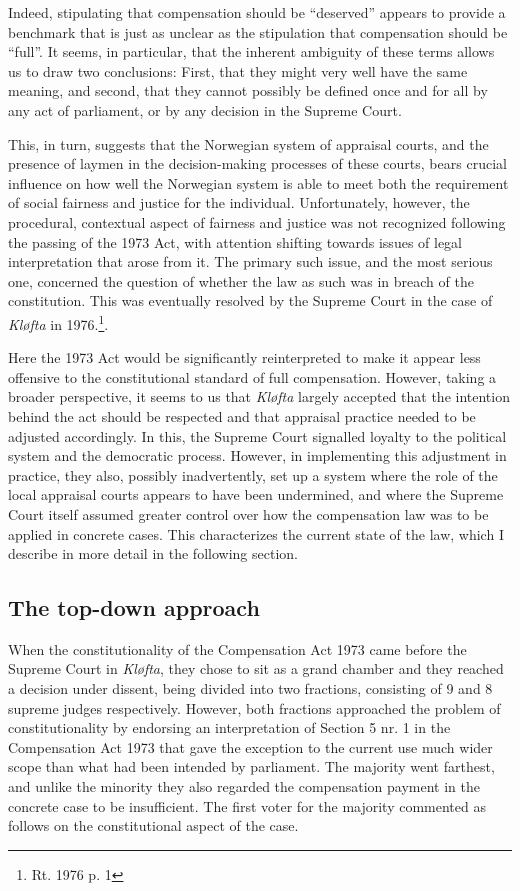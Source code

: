 Indeed, stipulating that compensation should be ``deserved'' appears to provide a benchmark that is just as unclear as the stipulation that compensation should be ``full''. It seems, in particular, that the inherent ambiguity of these terms allows us to draw two conclusions: First, that they might very well have the same meaning, and second, that they cannot possibly be defined once 
and for all by any act of parliament, or by any decision in the Supreme Court.

This, in turn, suggests that the Norwegian system of appraisal courts, and the presence of laymen in the decision-making processes of these courts, bears crucial influence on how well the Norwegian system is able to meet both the requirement of social fairness and justice for the individual. Unfortunately, however, the procedural, contextual aspect of fairness and justice was not recognized following the passing of the 1973 Act, with attention shifting towards issues of legal interpretation that arose from it. The primary such issue, and the most serious one, concerned the question of whether the law as such was in breach of the constitution. This was eventually resolved by the Supreme Court in the case of \emph{Kløfta} in 1976.\footnote{Rt. 1976 p. 1}. 

Here the 1973 Act would be significantly reinterpreted to make it appear less offensive to the constitutional standard of full compensation. However, taking a broader perspective, it seems to us that \emph{Kløfta} largely accepted that the intention behind the act should be respected and that appraisal practice needed to be adjusted accordingly. In this, the Supreme Court signalled loyalty to the political system and the democratic process. However, in implementing this adjustment in practice, they also, possibly inadvertently, set up a system where the role of the local appraisal courts appears to have been undermined, and where the Supreme Court itself assumed greater control over how the compensation law was to be applied in concrete cases. This characterizes the current state of the law, which I describe in more detail in the following section.

\subsection{The top-down approach}\label{sec:regab}

When the constitutionality of the Compensation Act 1973 came before the Supreme Court in \emph{Kløfta}, they chose to sit as a grand chamber and they reached a decision under dissent, being divided into two fractions, consisting of 9 and 8 supreme judges respectively. However, both fractions approached the problem of constitutionality by endorsing an interpretation of Section 5 nr. 1 in the Compensation Act 1973 that gave the exception to the current use much wider scope than what had been intended by parliament. The majority went farthest, and unlike the minority they also regarded the compensation payment in the concrete case to be insufficient. The first voter for the majority commented as follows on the constitutional aspect of the case.

